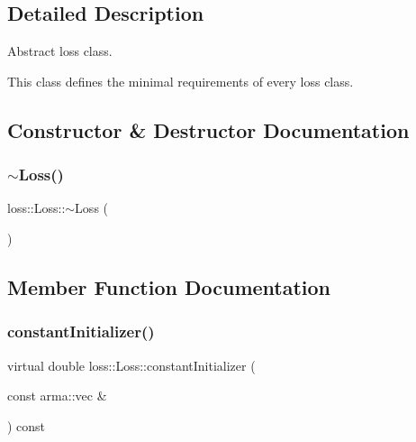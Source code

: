 \subsection{Detailed Description}
Abstract loss class. 

This class defines the minimal requirements of every loss class. 

\subsection{Constructor \& Destructor Documentation}
\mbox{\label{classloss_1_1_loss_a868a7908fd97590b6c4fc69f4eb3c570}} 
\subsubsection{\texorpdfstring{$\sim$\+Loss()}{~Loss()}}
{\footnotesize\ttfamily loss\+::\+Loss\+::$\sim$\+Loss (\begin{DoxyParamCaption}{ }\end{DoxyParamCaption})\hspace{0.3cm}{\ttfamily [virtual]}}



\subsection{Member Function Documentation}
\mbox{\label{classloss_1_1_loss_a65fe7dcd9370e6a549b8d1cc95fc8798}} 
\subsubsection{\texorpdfstring{constant\+Initializer()}{constantInitializer()}}
{\footnotesize\ttfamily virtual double loss\+::\+Loss\+::constant\+Initializer (\begin{DoxyParamCaption}\item[{const arma\+::vec \&}]{ }\end{DoxyParamCaption}) const\hspace{0.3cm}{\ttfamily [pure virtual]}}



